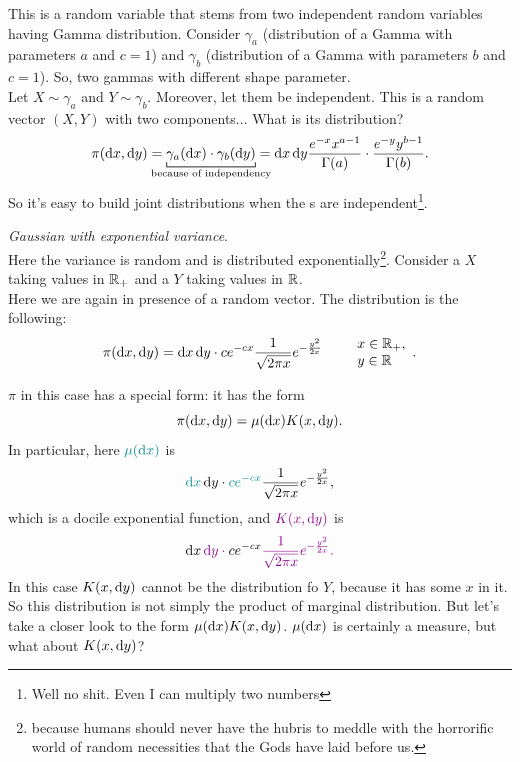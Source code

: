 \documentclass{report}
\begin{document}
\begin{example}
	This is a random variable that stems from two independent random variables having Gamma distribution. Consider $\gamma_a$ (distribution of a Gamma \rv{} with parameters $a$ and $c=1$) and $\gamma_b$ (distribution of a Gamma \rv{} with parameters $b$ and $c=1$). So, two gammas with different shape parameter. \\
	Let $X\sim\gamma_a$ and $Y\sim\gamma_b$. Moreover, let them be independent. This is a random vector $(X,Y)$ with two components... What is its distribution?
	\[\pi(\dx,\dy)=\underbracket[0.6pt]{\gamma_a(\dx)\cdot\gamma_b(\dy)}_{\mathclap{\text{because of independency}}}=\dx\dy\frac{e^{-x}x^{a-1}}{\Gamma(a)}\cdot\frac{e^{-y}y^{b-1}}{\Gamma(b)}.\]
	So it's easy to build joint distributions when the \rv s are independent\footnote{Well no shit. Even I can multiply two numbers}.
\end{example}
\begin{example}
	\emph{Gaussian \rv{} with exponential variance}.\\
	Here the variance is random and is distributed exponentially\footnote{because humans should never have the hubris to meddle with the horrorific world of random necessities that the Gods have laid before us.}. Consider a \rv{} $X$ taking values in $\mathbb{R}_+$ and a \rv{} $Y$ taking values in $\mathbb{R}$.\\
	Here we are again in presence of a random vector. The distribution is the following:
	\[\pi(\mathop{}\!\mathrm{d} x,\mathop{}\!\mathrm{d} y)=\mathop{}\!\mathrm{d} x\mathop{}\!\mathrm{d} y\cdot ce^{-cx}\frac{1}{\sqrt{2\pi x}}e^{-\frac{y^2}{2x}}\qquad \begin{array}{l}
		x\in\mathbb{R}_+,\\
		y\in\mathbb{R}
	\end{array}. \]
	\begin{remark}
		$\pi$ in this case has a special form: it has the form 
		\[\pi(\mathop{}\!\mathrm{d} x,\mathop{}\!\mathrm{d} y)=\mu(\mathop{}\!\mathrm{d} x)K(x,\mathop{}\!\mathrm{d} y).\]
		In particular, here $\color{Cyan4}\mu(\dx)$ is 
		\[\color{Cyan4}\dx\color{black}\dy\cdot\color{Cyan4} ce^{-cx}\color{black}\frac{1}{\sqrt{2\pi x}}e^{-\frac{y^2}{2x}},\]
		which is a docile exponential function, and $\color{Magenta4}K(x,\dy)$ is
		\[\color{black}\dx\color{Magenta4}\dy\cdot\color{black} ce^{-cx}\color{Magenta4}\frac{1}{\sqrt{2\pi x}}e^{-\frac{y^2}{2x}}.\]
		In this case $K(x,\mathop{}\!\mathrm{d} y)$ cannot be the distribution fo $Y$, because it has some $x$ in it. So this distribution is not simply the product of marginal distribution. But let's take a closer look to the form $\mu(\mathop{}\!\mathrm{d} x)K(x,\mathop{}\!\mathrm{d} y)$. $\mu(\mathop{}\!\mathrm{d} x)$ is certainly a measure, but what about $K(x,\mathop{}\!\mathrm{d} y)$? \par
	\end{remark}
\end{example}
\end{document}
